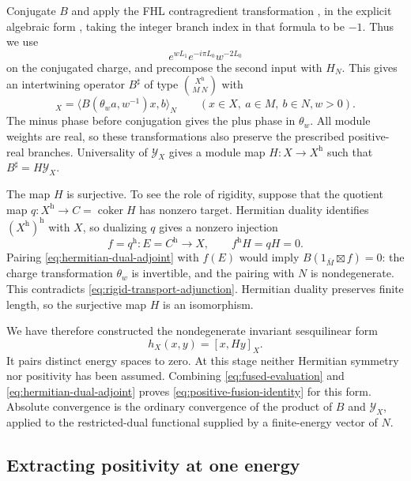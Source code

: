 Conjugate $B$ and apply the FHL contragredient transformation
\cite[Section~5.5]{FHL}, in the explicit algebraic form
\cite[Equation~(3.87), Proposition~3.46]{HLZII}, taking the integer
branch index in that formula to be $-1$.  Thus we use
\[
 e^{wL_1}e^{-i\pi L_0}w^{-2L_0}
\]
on the conjugated charge, and precompose the second input with
$H_N$.  This gives an intertwining
operator $B^\sharp$ of type $\binom{X^{\mathrm h}}{M\ N}$ with
\begin{equation}
 [x,B^\sharp(a,w)b]_X
   =\langle B(\theta_w a,w^{-1})x,b\rangle_N
 \qquad(x\in X,\ a\in M,\ b\in N, w>0).
 \label{eq:hermitian-dual-adjoint}
\end{equation}
The minus phase before conjugation gives the plus phase in
$\theta_w$.  All module weights are real, so these transformations
also preserve the prescribed positive-real branches.
Universality of $\mathcal Y_X$ gives a module map
$H:X\longrightarrow X^{\mathrm h}$ such that
$B^\sharp=H\mathcal Y_X$.

The map $H$ is surjective.  To see the role of rigidity, suppose that
the quotient map $q:X^{\mathrm h}\longrightarrow C=\operatorname{coker}H$
has nonzero target.  Hermitian duality identifies
$(X^{\mathrm h})^{\mathrm h}$ with $X$, so dualizing $q$ gives a
nonzero injection
\[
 f=q^{\mathrm h}:E=C^{\mathrm h}\longrightarrow X,
 \qquad f^{\mathrm h}H=qH=0.
\]
Pairing \eqref{eq:hermitian-dual-adjoint} with $f(E)$ would imply
$B(1_{\bar M}\boxtimes f)=0$: the charge transformation $\theta_w$
is invertible, and the pairing with $N$ is nondegenerate.  This
contradicts \eqref{eq:rigid-transport-adjunction}.  Hermitian duality
preserves finite length, so the surjective map $H$ is an isomorphism.

We have therefore constructed the nondegenerate invariant
sesquilinear form
\begin{equation}
 h_X(x,y)=[x,Hy]_X.
 \label{eq:algebraic-fusion-form}
\end{equation}
It pairs distinct energy spaces to zero.  At this stage neither
Hermitian symmetry nor positivity has been assumed.  Combining
\eqref{eq:fused-evaluation} and
\eqref{eq:hermitian-dual-adjoint} proves
\eqref{eq:positive-fusion-identity} for this form.  Absolute
convergence is the ordinary convergence of the product of $B$ and
$\mathcal Y_X$, applied to the restricted-dual functional supplied
by a finite-energy vector of $N$.

\subsection{Extracting positivity at one energy}

